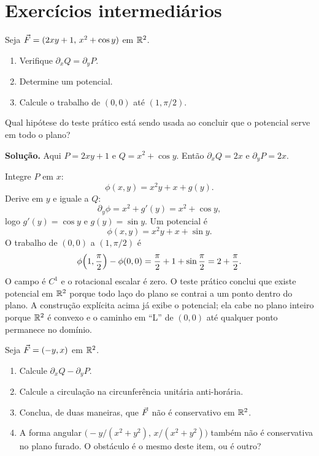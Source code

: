 \documentclass[11pt,a4paper]{article}
\begin{document}
\section{Exercícios intermediários}

\begin{exercicio}
Seja $\vec{F}=(2xy+1,\, x^2+\cos y)$ em $\mathbb{R}^2$.
\begin{enumerate}
\item Verifique $\partial_x Q=\partial_y P$.
\item Determine um potencial.
\item Calcule o trabalho de $(0,0)$ até $(1,\pi/2)$.
\end{enumerate}
Qual hipótese do teste prático está sendo usada ao concluir que o potencial serve em todo o plano?
\end{exercicio}

\noindent\textbf{Solução.}
Aqui $P=2xy+1$ e $Q=x^2+\cos y$. Então $\partial_x Q=2x$ e $\partial_y P=2x$.

Integre $P$ em $x$:
\[
\phi(x,y)=x^2 y+x+g(y).
\]
Derive em $y$ e iguale a $Q$:
\[
\partial_y\phi=x^2+g'(y)=x^2+\cos y,
\]
logo $g'(y)=\cos y$ e $g(y)=\sin y$. Um potencial é
\[
\phi(x,y)=x^2 y+x+\sin y.
\]
O trabalho de $(0,0)$ a $(1,\pi/2)$ é
\[
\phi\Bigl(1,\frac\pi2\Bigr)-\phi(0,0)
=\frac\pi2+1+\sin\frac\pi2
=2+\frac\pi2.
\]
O campo é $C^1$ e o rotacional escalar é zero. O teste prático conclui que existe potencial em $\mathbb{R}^2$ porque todo laço do plano se contrai a um ponto dentro do plano. A construção explícita acima já exibe o potencial; ela cabe no plano inteiro porque $\mathbb{R}^2$ é convexo e o caminho em ``L'' de $(0,0)$ até qualquer ponto permanece no domínio.

\begin{exercicio}
Seja $\vec{F}=(-y,x)$ em $\mathbb{R}^2$.
\begin{enumerate}
\item Calcule $\partial_x Q-\partial_y P$.
\item Calcule a circulação na circunferência unitária anti-horária.
\item Conclua, de duas maneiras, que $\vec{F}$ não é conservativo em $\mathbb{R}^2$.
\item A forma angular $\bigl(-y/(x^2+y^2),\, x/(x^2+y^2)\bigr)$ também não é conservativa no plano furado. O obstáculo é o mesmo deste item, ou é outro?
\end{enumerate}
\end{exercicio}
\end{document}
